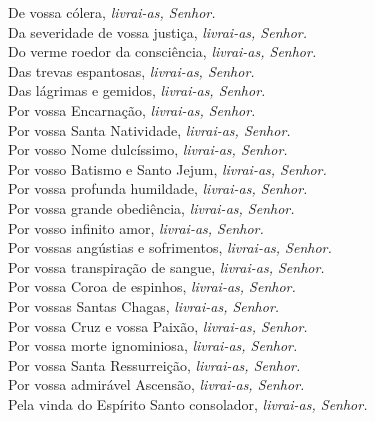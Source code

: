 De vossa cólera, \textit{livrai-as, Senhor.} \\
Da severidade de vossa justiça, \textit{livrai-as, Senhor.} \\
Do verme roedor da consciência, \textit{livrai-as, Senhor.} \\
Das trevas espantosas, \textit{livrai-as, Senhor.} \\
Das lágrimas e gemidos, \textit{livrai-as, Senhor.} \\
Por vossa Encarnação, \textit{livrai-as, Senhor.} \\
Por vossa Santa Natividade, \textit{livrai-as, Senhor.} \\
Por vosso Nome dulcíssimo, \textit{livrai-as, Senhor.} \\
Por vosso Batismo e Santo Jejum, \textit{livrai-as, Senhor.} \\
Por vossa profunda humildade, \textit{livrai-as, Senhor.} \\
Por vossa grande obediência, \textit{livrai-as, Senhor.} \\
Por vosso infinito amor, \textit{livrai-as, Senhor.} \\
Por vossas angústias e sofrimentos, \textit{livrai-as, Senhor.} \\
Por vossa transpiração de sangue, \textit{livrai-as, Senhor.} \\
Por vossa Coroa de espinhos, \textit{livrai-as, Senhor.} \\
Por vossas Santas Chagas, \textit{livrai-as, Senhor.} \\
Por vossa Cruz e vossa Paixão, \textit{livrai-as, Senhor.} \\
Por vossa morte ignominiosa, \textit{livrai-as, Senhor.} \\
Por vossa Santa Ressurreição, \textit{livrai-as, Senhor.} \\
Por vossa admirável Ascensão, \textit{livrai-as, Senhor.} \\
Pela vinda do Espírito Santo consolador, \textit{livrai-as, Senhor.} \\


